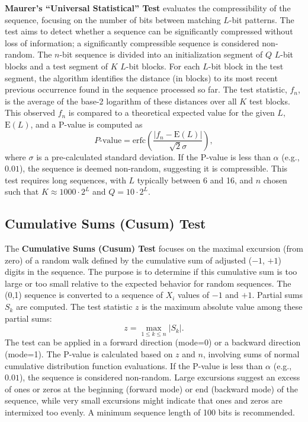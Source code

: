 \textbf{Maurer's ``Universal Statistical'' Test} evaluates the compressibility of the sequence, focusing on the number of bits between matching $L$-bit patterns. The test aims to detect whether a sequence can be significantly compressed without loss of information; a significantly compressible sequence is considered non-random. The $n$-bit sequence is divided into an initialization segment of $Q$ $L$-bit blocks and a test segment of $K$ $L$-bit blocks. For each $L$-bit block in the test segment, the algorithm identifies the distance (in blocks) to its most recent previous occurrence found in the sequence processed so far. The test statistic, $f_n$, is the average of the base-2 logarithm of these distances over all $K$ test blocks. This observed $f_n$ is compared to a theoretical expected value for the given $L$, $\text{E}(L)$, and a P-value is computed as
\[
P\text{-value} = \text{erfc}\left(\frac{|f_n - \text{E}(L)|}{\sqrt{2}\sigma}\right),
\]
where $\sigma$ is a pre-calculated standard deviation. If the P-value is less than $\alpha$ (e.g., $0.01$), the sequence is deemed non-random, suggesting it is compressible. This test requires long sequences, with $L$ typically between 6 and 16, and $n$ chosen such that $K \approx 1000 \cdot 2^L$ and $Q = 10 \cdot 2^L$.

\subsection{Cumulative Sums (Cusum) Test}

The \textbf{Cumulative Sums (Cusum) Test} focuses on the maximal excursion (from zero) of a random walk defined by the cumulative sum of adjusted ($-1$, $+1$) digits in the sequence. The purpose is to determine if this cumulative sum is too large or too small relative to the expected behavior for random sequences. The (0,1) sequence is converted to a sequence of $X_i$ values of $-1$ and $+1$. Partial sums $S_k$ are computed. The test statistic $z$ is the maximum absolute value among these partial sums:
\[
z = \max_{1 \le k \le n} |S_k|.
\]
The test can be applied in a forward direction (mode=0) or a backward direction (mode=1). The P-value is calculated based on $z$ and $n$, involving sums of normal cumulative distribution function evaluations. If the P-value is less than $\alpha$ (e.g., $0.01$), the sequence is considered non-random. Large excursions suggest an excess of ones or zeros at the beginning (forward mode) or end (backward mode) of the sequence, while very small excursions might indicate that ones and zeros are intermixed too evenly. A minimum sequence length of 100 bits is recommended.

